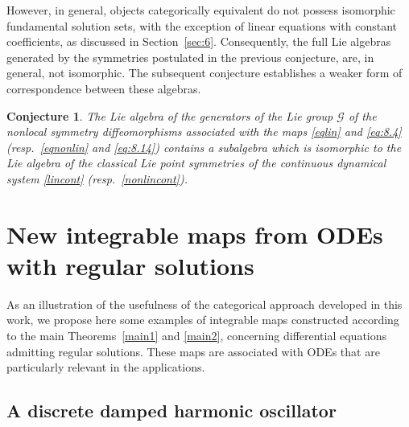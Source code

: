 \documentclass[10pt]{amsart}
\numberwithin{equation}{section}
\newtheorem{conjecture}{Conjecture}
\theoremstyle{definition}
\begin{document}
However, in general, objects categorically equivalent do not possess isomorphic
fundamental solution sets, with the exception of linear equations with
constant coefficients, as discussed in Section~\ref{sec:6}. Consequently, the full
Lie algebras generated by the symmetries postulated in the previous conjecture,
are, in general, not isomorphic. The subsequent conjecture establishes
a weaker form of correspondence between these algebras.

\begin{conjecture}
\label{conj2}
The Lie algebra of the generators of the Lie group $\mathcal{G}$ of the
nonlocal symmetry diffeomorphisms associated with the maps  \eqref{eqlin}  and  \eqref{eq:8.4} (resp.~\eqref{eqnonlin} and  \eqref{eq:8.14}) contains a subalgebra which is isomorphic to the Lie algebra
of the classical Lie point symmetries of the continuous dynamical system  \eqref{lincont} (resp.~\eqref{nonlincont}).
\end{conjecture}

\section{New integrable maps from ODEs with regular solutions}
\label{sec:9}

As an illustration of the usefulness of the categorical approach developed
in this work, we propose here some examples of integrable maps constructed
according to the main  Theorems~\ref{main1} and \ref{main2}, concerning
differential equations admitting regular solutions. These maps are associated
with ODEs that are particularly relevant in the applications.

\subsection{A discrete damped harmonic oscillator}
\label{sec10.1}
\end{document}
